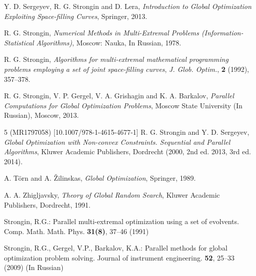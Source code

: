 \documentclass[runningheads]{llncs}
\begin{document}
%
%
% 
% 
%
\begin{thebibliography}{107}

\newblock Y. D. Sergeyev, R. G. Strongin and D. Lera,
\newblock \emph{Introduction to Global Optimization Exploiting Space-filling Curves},
\newblock Springer, 2013.

\newblock R. G. Strongin,
\newblock \emph{Numerical Methods in Multi-Extremal Problems (Information-Statistical Algorithms)},
\newblock Moscow: Nauka, In Russian, 1978.

\newblock R. G. Strongin,
\newblock \emph{\emph{Algorithms for multi-extremal mathematical programming problems employing a set of joint space-filling curves}},
\newblock \emph{J. Glob. Optim.}, \textbf{2} (1992), 357--378.

\newblock R. G. Strongin, V. P. Gergel, V. A. Grishagin and K. A. Barkalov,
\newblock \emph{Parallel Computations for Global Optimization Problems},
\newblock Moscow State University (In Russian), Moscow, 2013.

5 (MR1797058) [10.1007/978-1-4615-4677-1]
\newblock R. G. Strongin and Y. D. Sergeyev,
\newblock \emph{Global Optimization with Non-convex Constraints. Sequential and Parallel Algorithms},
\newblock Kluwer Academic Publishers, Dordrecht (2000, 2nd ed. 2013, 3rd ed. 2014).

\newblock A. T\"orn and A. \v Zilinskas,
\newblock \emph{Global Optimization},
\newblock Springer, 1989.

\newblock A. A. Zhigljavsky,
\newblock \emph{Theory of Global Random Search},
\newblock Kluwer Academic Publishers, Dordrecht, 1991.

Strongin, R.G.: Parallel multi-extremal optimization using a set of evolvents. Comp. Math. Math. Phys. \textbf{31(8)}, 37--46 (1991)

Strongin, R.G., Gergel, V.P., Barkalov, K.A.: Parallel methods for global optimization problem solving. Journal of instrument engineering. \textbf{52}, 25--33 (2009) (In Russian)


\end{thebibliography}
\end{document}
